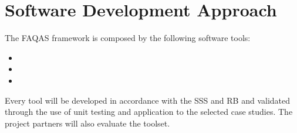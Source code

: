 \section{Software Development Approach}

The FAQAS framework is composed by the following software tools:
\begin{itemize}
  \item \MASS
  \item \DAMA
  \item \SEMUS
\end{itemize}

Every tool will be developed in accordance with the SSS and RB and validated through the use of unit testing and application to the selected case studies.
The project partners will also evaluate the toolset.
